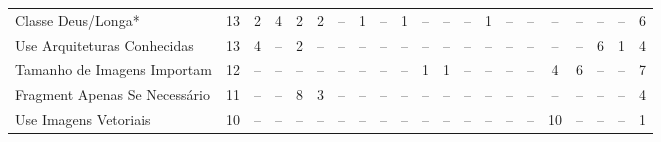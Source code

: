 \begin{table*}[t]
\begin{tabular}{@{}p{3.8cm}p{0.3cm}p{.2cm}p{.2cm}p{.2cm}p{.2cm}p{.2cm}p{.2cm}p{.2cm}p{.2cm}p{.2cm}p{.4cm}p{.4cm}p{.4cm}p{.4cm}p{.4cm}p{.4cm}p{.4cm}p{.4cm}p{.4cm}p{0.2cm}@{}}
Classe Deus/Longa*				& \multicolumn{1}{c}{13} 	& \multicolumn{1}{c}{2} 	& \multicolumn{1}{c}{4} 	& \multicolumn{1}{c}{2}	 	& \multicolumn{1}{c}{2} 	& \multicolumn{1}{c}{--} 	& \multicolumn{1}{c}{1} 	& \multicolumn{1}{c}{--} 	& \multicolumn{1}{c}{1} 	& \multicolumn{1}{c}{--} 	& \multicolumn{1}{c}{--} 	& \multicolumn{1}{c}{--} 	& \multicolumn{1}{c}{1} 	& \multicolumn{1}{c}{--} 	& \multicolumn{1}{c}{--} 	& \multicolumn{1}{c}{--}	& \multicolumn{1}{c}{--} 	& \multicolumn{1}{c}{--} 	& \multicolumn{1}{c}{--} 	& \multicolumn{1}{c}{6} \\
Use Arquiteturas Conhecidas		& \multicolumn{1}{c}{13} 	& \multicolumn{1}{c}{4} 	& \multicolumn{1}{c}{--} 	& \multicolumn{1}{c}{2}	 	& \multicolumn{1}{c}{--} 	& \multicolumn{1}{c}{--} 	& \multicolumn{1}{c}{--} 	& \multicolumn{1}{c}{--} 	& \multicolumn{1}{c}{--} 	& \multicolumn{1}{c}{--} 	& \multicolumn{1}{c}{--} 	& \multicolumn{1}{c}{--} 	& \multicolumn{1}{c}{--} 	& \multicolumn{1}{c}{--} 	& \multicolumn{1}{c}{--} 	& \multicolumn{1}{c}{--}	& \multicolumn{1}{c}{--} 	& \multicolumn{1}{c}{6} 	& \multicolumn{1}{c}{1} 	& \multicolumn{1}{c}{4} \\
Tamanho de Imagens Importam		& \multicolumn{1}{c}{12} 	& \multicolumn{1}{c}{--} 	& \multicolumn{1}{c}{--} 	& \multicolumn{1}{c}{--} 	& \multicolumn{1}{c}{--} 	& \multicolumn{1}{c}{--} 	& \multicolumn{1}{c}{--} 	& \multicolumn{1}{c}{--} 	& \multicolumn{1}{c}{--} 	& \multicolumn{1}{c}{1} 	& \multicolumn{1}{c}{1} 	& \multicolumn{1}{c}{--} 	& \multicolumn{1}{c}{--} 	& \multicolumn{1}{c}{--} 	& \multicolumn{1}{c}{--} 	& \multicolumn{1}{c}{4}		& \multicolumn{1}{c}{6} 	& \multicolumn{1}{c}{--} 	& \multicolumn{1}{c}{--} 	& \multicolumn{1}{c}{7} \\
Fragment Apenas Se Necessário	& \multicolumn{1}{c}{11} 	& \multicolumn{1}{c}{--} 	& \multicolumn{1}{c}{--} 	& \multicolumn{1}{c}{8}	 	& \multicolumn{1}{c}{3} 	& \multicolumn{1}{c}{--} 	& \multicolumn{1}{c}{--} 	& \multicolumn{1}{c}{--} 	& \multicolumn{1}{c}{--} 	& \multicolumn{1}{c}{--} 	& \multicolumn{1}{c}{--} 	& \multicolumn{1}{c}{--} 	& \multicolumn{1}{c}{--} 	& \multicolumn{1}{c}{--} 	& \multicolumn{1}{c}{--} 	& \multicolumn{1}{c}{--}	& \multicolumn{1}{c}{--} 	& \multicolumn{1}{c}{--} 	& \multicolumn{1}{c}{--} 	& \multicolumn{1}{c}{4} \\
Use Imagens Vetoriais			& \multicolumn{1}{c}{10} 	& \multicolumn{1}{c}{--} 	& \multicolumn{1}{c}{--} 	& \multicolumn{1}{c}{--} 	& \multicolumn{1}{c}{--} 	& \multicolumn{1}{c}{--} 	& \multicolumn{1}{c}{--} 	& \multicolumn{1}{c}{--} 	& \multicolumn{1}{c}{--} 	& \multicolumn{1}{c}{--} 	& \multicolumn{1}{c}{--} 	& \multicolumn{1}{c}{--} 	& \multicolumn{1}{c}{--} 	& \multicolumn{1}{c}{--} 	& \multicolumn{1}{c}{--} 	& \multicolumn{1}{c}{10}	& \multicolumn{1}{c}{--} 	& \multicolumn{1}{c}{--} 	& \multicolumn{1}{c}{--} 	& \multicolumn{1}{c}{1} \\

\end{tabular}
\end{table*}
